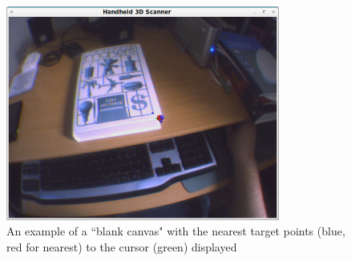 \documentclass[a4paper,10pt]{article}
\begin{document}
\begin{figure}
  \begin{center}
    \includegraphics[width=340px]{TargetPoints}
  \end{center}
  \caption{An example of a ``blank canvas" with the nearest target points (blue, red for nearest) to the cursor (green) displayed}
  \label{targets}
\end{figure}
\end{document}
